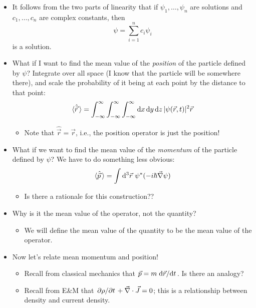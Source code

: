 \documentclass[../notes.tex]{subfiles}
\begin{document}
\begin{itemize}
    \item It follows from the two parts of linearity that if $\psi_1,\dots,\psi_n$ are solutions and $c_1,\dots,c_n$ are complex constants, then
    \begin{equation*}
        \psi = \sum_{i=1}^nc_i\psi_i
    \end{equation*}
    is a solution.
    \item What if I want to find the mean value of the \emph{position} of the particle defined by $\psi$? Integrate over all space (I know that the particle will be somewhere there), and scale the probability of it being at each point by the distance to that point:
    \begin{equation*}
        \langle{\hat{\vec{r}}}\,\rangle = \int_{-\infty}^\infty\int_{-\infty}^\infty\int_{-\infty}^\infty\dd{x}\dd{y}\dd{z}|\psi(\vec{r},t)|^2\vec{r}
    \end{equation*}
    \begin{itemize}
        \item Note that $\hat{\vec{r}}=\vec{r}$, i.e., the position operator is just the position!
    \end{itemize}
    \item What if we want to find the mean value of the \emph{momentum} of the particle defined by $\psi$? We have to do something less obvious:
    \begin{equation*}
        \Exp{\hat{\vec{p}}} = \int\dd^3\vec{r}\ \psi^*(-i\hbar\vec{\nabla}\psi)
    \end{equation*}
    \begin{itemize}
        \item Is there a rationale for this construction??
    \end{itemize}
    \item Why is it the mean value of the operator, not the quantity?
    \begin{itemize}
        \item We will define the mean value of the quantity to be the mean value of the operator.
    \end{itemize}
    \item Now let's relate mean momentum and position!
    \begin{itemize}
        \item Recall from classical mechanics that $\vec{p}=m\dv*{\vec{r}}{t}$. Is there an analogy?
        \item Recall from E\&M that $\pdv*{\rho}{t}+\vec{\nabla}\cdot\vec{J}=0$; this is a relationship between density and current density.

\end{itemize}
\end{itemize}
\end{document}
